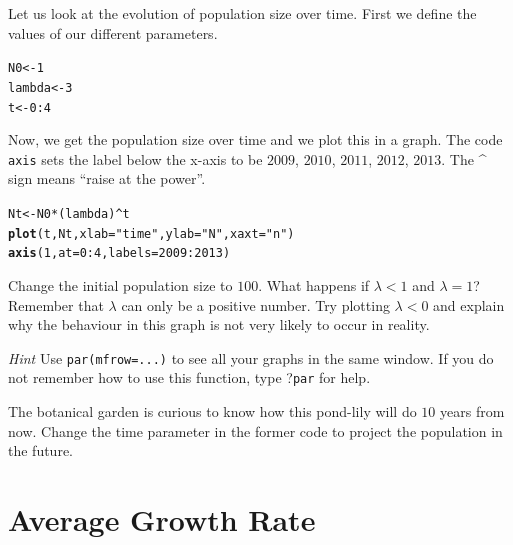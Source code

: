 \documentclass{article}\usepackage[]{graphicx}\usepackage[]{color}
\makeatletter
\newcommand{\hlnum}[1]{\textcolor[rgb]{0.686,0.059,0.569}{#1}}%
\newcommand{\hlstr}[1]{\textcolor[rgb]{0.192,0.494,0.8}{#1}}%
\newcommand{\hlopt}[1]{\textcolor[rgb]{0,0,0}{#1}}%
\newcommand{\hlstd}[1]{\textcolor[rgb]{0.345,0.345,0.345}{#1}}%
\newcommand{\hlkwb}[1]{\textcolor[rgb]{0.69,0.353,0.396}{#1}}%
\newcommand{\hlkwc}[1]{\textcolor[rgb]{0.333,0.667,0.333}{#1}}%
\newcommand{\hlkwd}[1]{\textcolor[rgb]{0.737,0.353,0.396}{\textbf{#1}}}%
\newenvironment{kframe}{%
 \def\at@end@of@kframe{}%
 \ifinner\ifhmode%
  \def\at@end@of@kframe{\end{minipage}}%
  \begin{minipage}{\columnwidth}%
 \fi\fi%
 \def\FrameCommand##1{\hskip\@totalleftmargin \hskip-\fboxsep
 \colorbox{shadecolor}{##1}\hskip-\fboxsep
     \hskip-\linewidth \hskip-\@totalleftmargin \hskip\columnwidth}%
 \MakeFramed {\advance\hsize-\width
   \@totalleftmargin\z@ \linewidth\hsize
   \@setminipage}}%
 {\par\unskip\endMakeFramed%
 \at@end@of@kframe}
\newenvironment{knitrout}{}{} %
\makeatother
\begin{document}
Let us look at the evolution of population size over time. First we define the values of our different parameters.
\begin{knitrout}
\color{fgcolor}\begin{kframe}
\begin{alltt}
\hlstd{N0} \hlkwb{<-} \hlnum{1}
\hlstd{lambda} \hlkwb{<-} \hlnum{3}
\hlstd{t} \hlkwb{<-} \hlnum{0}\hlopt{:}\hlnum{4}
\end{alltt}
\end{kframe}
\end{knitrout}
Now, we get the population size over time and we plot this in a graph. The code \texttt{axis} sets the label below the x-axis to be $2009$, $2010$, $2011$, $2012$, $2013$. The \textasciicircum  \; sign means \textquotedblleft raise at the power\textquotedblright.
\begin{knitrout}
\color{fgcolor}\begin{kframe}
\begin{alltt}
\hlstd{Nt} \hlkwb{<-} \hlstd{N0}\hlopt{*}\hlstd{(lambda)}\hlopt{^}\hlstd{t}
\hlkwd{plot}\hlstd{(t, Nt,} \hlkwc{xlab}\hlstd{=}\hlstr{"time"}\hlstd{,} \hlkwc{ylab}\hlstd{=}\hlstr{"N"}\hlstd{,} \hlkwc{xaxt} \hlstd{=} \hlstr{"n"}\hlstd{)}
\hlkwd{axis}\hlstd{(}\hlnum{1}\hlstd{,} \hlkwc{at}\hlstd{=}\hlnum{0}\hlopt{:}\hlnum{4}\hlstd{,} \hlkwc{labels}\hlstd{=}\hlnum{2009}\hlopt{:}\hlnum{2013}\hlstd{)}
\end{alltt}
\end{kframe}
\end{knitrout}
Change the initial population size to $100$. What happens if $\lambda<1$ and $\lambda=1$? Remember that $\lambda$ can only be a positive number. Try plotting $\lambda<0$ and explain why the behaviour in this graph is not very likely to occur in reality. 


 \textit{Hint} Use \texttt{par(mfrow=...)} to see all your graphs in the same window. If you do not remember how to use this function, type ?\texttt{par} for help. 

The botanical garden is curious to know how this pond-lily will do $10$ years from now. Change the time parameter in the former code to project the population in the future. 

\section{Average Growth Rate}
\end{document}

